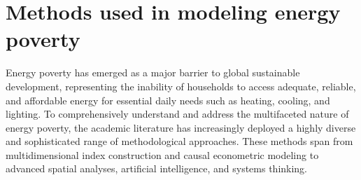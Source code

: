 \documentclass[11pt,a4paper]{article}
\begin{document}

\section{Methods used in modeling energy poverty}


Energy poverty has emerged as a major barrier to global sustainable development, representing the inability of households to access adequate, reliable, and affordable energy for essential daily needs such as heating, cooling, and lighting. To comprehensively understand and address the multifaceted nature of energy poverty, the academic literature has increasingly deployed a highly diverse and sophisticated range of methodological approaches. These methods span from multidimensional index construction and causal econometric modeling to advanced spatial analyses, artificial intelligence, and systems thinking.
\end{document}

